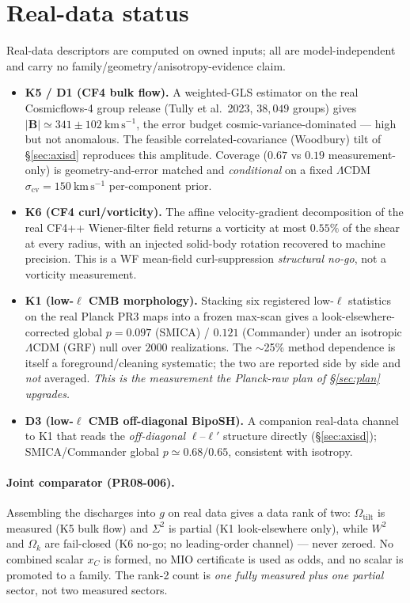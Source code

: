 \documentclass[11pt]{article}
\newcommand{\Sig}{\Sigma^2}
\newcommand{\Wsq}{W^2}
\newcommand{\Otilt}{\Omega_{\mathrm{tilt}}}
\newcommand{\Ok}{\Omega_{k}}
\begin{document}
\section{Real-data status}\label{sec:data}

Real-data descriptors are computed on owned inputs; all are model-independent and
carry no family/geometry/anisotropy-evidence claim.

\begin{itemize}
\item \textbf{K5 / D1 (CF4 bulk flow).} A weighted-GLS estimator on the real
Cosmicflows-4 group release (Tully et al.\ 2023, $38{,}049$ groups) gives
$|\mathbf{B}|\simeq 341\pm 102\ \mathrm{km\,s^{-1}}$, the error budget
cosmic-variance-dominated --- high but not anomalous. The feasible
correlated-covariance (Woodbury) tilt of \S\ref{sec:axisd} reproduces this
amplitude. Coverage ($0.67$ vs $0.19$ measurement-only) is
geometry-and-error matched and \emph{conditional} on a fixed $\Lambda$CDM
$\sigma_{\mathrm{cv}}=150\ \mathrm{km\,s^{-1}}$ per-component prior.
\item \textbf{K6 (CF4 curl/vorticity).} The affine velocity-gradient
decomposition of the real CF4{+}{+} Wiener-filter field returns a vorticity at
most $0.55\%$ of the shear at every radius, with an injected solid-body rotation
recovered to machine precision. This is a WF mean-field curl-suppression
\emph{structural no-go}, not a vorticity measurement.
\item \textbf{K1 (low-$\ell$ CMB morphology).} Stacking six registered low-$\ell$
statistics on the real Planck PR3 maps into a frozen max-scan gives a
look-elsewhere-corrected global $p=0.097$ (SMICA) / $0.121$ (Commander) under an
isotropic $\Lambda$CDM (GRF) null over $2000$ realizations. The $\sim$25\% method
dependence is itself a foreground/cleaning systematic; the two are reported side
by side and \emph{not} averaged. \emph{This is the measurement the Planck-raw
plan of \S\ref{sec:plan} upgrades.}
\item \textbf{D3 (low-$\ell$ CMB off-diagonal BipoSH).} A companion real-data
channel to K1 that reads the \emph{off-diagonal} $\ell$--$\ell'$ structure
directly (\S\ref{sec:axisd}); SMICA/Commander global $p\simeq0.68/0.65$,
consistent with isotropy.
\end{itemize}

\paragraph{Joint comparator (PR08-006).} Assembling the discharges into $g$ on
real data gives a data rank of two: $\Otilt$ is measured (K5 bulk flow) and
$\Sig$ is partial (K1 look-elsewhere only), while $\Wsq$ and $\Ok$ are
fail-closed (K6 no-go; no leading-order channel) --- never zeroed. No combined
scalar $x_C$ is formed, no MIO certificate is used as odds, and no scalar is
promoted to a family. The rank-2 count is \emph{one fully measured plus one
partial} sector, not two measured sectors.
\end{document}
